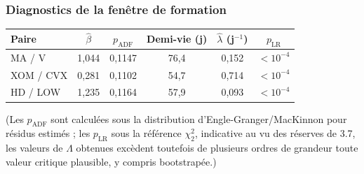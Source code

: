\documentclass{article}
\begin{document}
\subsubsection*{Diagnostics de la fenêtre de formation}
\begin{center}
\begin{tabular}{lccccc}
\toprule
Paire & $\hat\beta$ & $p_{\text{ADF}}$ & Demi-vie (j) & $\hat\lambda$ (j$^{-1}$) & $p_{\text{LR}}$ \\
\midrule
MA / V & 1{,}044 & 0{,}1147 & 76{,}4 & 0{,}152 & $<10^{-4}$ \\
XOM / CVX & 0{,}281 & 0{,}1102 & 54{,}7 & 0{,}714 & $<10^{-4}$ \\
HD / LOW & 1{,}235 & 0{,}1164 & 57{,}9 & 0{,}093 & $<10^{-4}$ \\
\bottomrule
\end{tabular}
\end{center}
(Les $p_{\text{ADF}}$ sont calculées sous la distribution d'Engle-Granger/MacKinnon pour résidus estimés ; les $p_{\text{LR}}$ sous la référence $\chi^2_2$, indicative au vu des réserves de 3.7, les valeurs de $\Lambda$ obtenues excèdent toutefois de plusieurs ordres de grandeur toute valeur critique plausible, y compris bootstrapée.)
\end{document}
